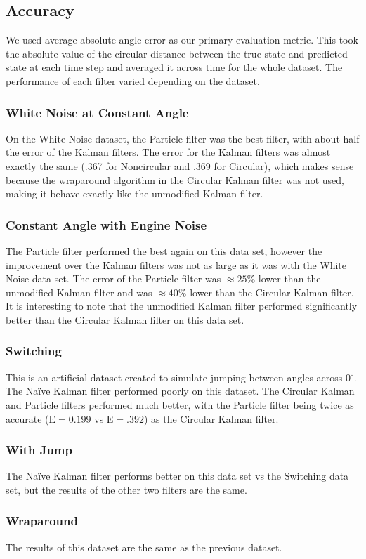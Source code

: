 \documentclass[11pt]{amsart}
\begin{document}
\subsection{Accuracy}
We used average absolute angle error as our primary evaluation metric. This took the absolute value of the circular distance between the true state and predicted state at each time step and averaged it across time for the whole dataset. The performance of each filter varied depending on the dataset.
\subsubsection{White Noise at Constant Angle}
On the White Noise dataset, the Particle filter was the best filter, with about half the error of the Kalman filters. The error for the Kalman filters was almost exactly the same (.367 for Noncircular and .369 for Circular), which makes sense because the wraparound algorithm in the Circular Kalman filter was not used, making it behave exactly like the unmodified Kalman filter.
\subsubsection{Constant Angle with Engine Noise}
The Particle filter performed the best again on this data set, however the improvement over the Kalman filters was not as large as it was with the White Noise data set. The error of the Particle filter was $\approx 25\%$ lower than the unmodified Kalman filter and was $\approx 40\%$ lower than the Circular Kalman filter. It is interesting to note that the unmodified Kalman filter performed significantly better than the Circular Kalman filter on this data set.
\subsubsection{Switching}
This is an artificial dataset created to simulate jumping between angles across $0^{\circ}$. The Naïve Kalman filter performed poorly on this dataset. The Circular Kalman and Particle filters performed much better, with the Particle filter being twice as accurate ($\mathrm{E}=0.199$ vs $\mathrm{E}=.392$) as the Circular Kalman filter.
\subsubsection{With Jump}
The Naïve Kalman filter performs better on this data set vs the Switching data set, but the results of the other two filters are the same.
\subsubsection{Wraparound}
The results of this dataset are the same as the previous dataset.
\end{document}
